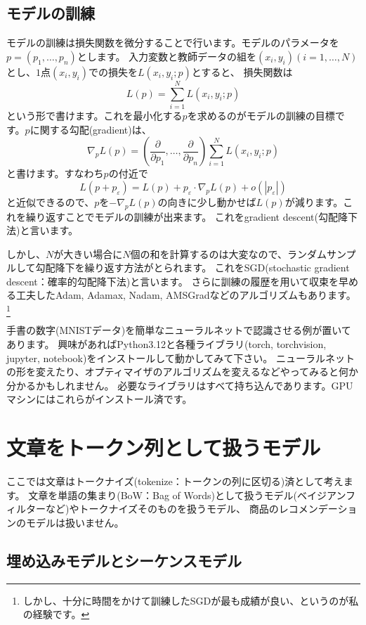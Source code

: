 \documentclass[a4j]{jarticle}
\begin{document}
\subsection{モデルの訓練}
モデルの訓練は損失関数を微分することで行います。モデルのパラメータを$p=(p_1,\ldots,p_n)$とします。
入力変数と教師データの組を$(x_i,y_i) (i=1,\ldots,N)$とし、$1$点$(x_i,y_i)$での損失を$L(x_i, y_i; p)$とすると、
損失関数は
$$L(p) = \sum_{i=1}^N L(x_i, y_i; p)$$
という形で書けます。これを最小化する$p$を求めるのがモデルの訓練の目標です。$p$に関する勾配(gradient)は、
$$\nabla_p L(p)  = \left(\frac\partial{\partial p_1},\ldots,\frac\partial{\partial p_n}\right)\sum_{i=1}^N L(x_i, y_i; p)$$
と書けます。すなわち$p$の付近で
$$L(p+p_\varepsilon) = L(p)+p_\varepsilon\cdot\nabla_p L(p) + o(|p_\varepsilon|)$$
と近似できるので、$p$を$-\nabla_p L(p)$の向きに少し動かせば$L(p)$が減ります。これを繰り返すことでモデルの訓練が出来ます。
これをgradient descent(勾配降下法)と言います。

しかし、$N$が大きい場合に$N$個の和を計算するのは大変なので、ランダムサンプルして勾配降下を繰り返す方法がとられます。
これをSGD(stochastic gradient descent：確率的勾配降下法)と言います。
さらに訓練の履歴を用いて収束を早める工夫したAdam, Adamax, Nadam, AMSGradなどのアルゴリズムもあります。
\footnote{しかし、十分に時間をかけて訓練したSGDが最も成績が良い、というのが私の経験です。}


手書の数字(MNISTデータ)を簡単なニューラルネットで認識させる例が置いてあります。
興味があればPython3.12と各種ライブラリ(torch, torchvision, jupyter, notebook)をインストールして動かしてみて下さい。
ニューラルネットの形を変えたり、オプティマイザのアルゴリズムを変えるなどやってみると何か分かるかもしれません。
必要なライブラリはすべて持ち込んであります。GPUマシンにはこれらがインストール済です。


\section{文章をトークン列として扱うモデル}
ここでは文章はトークナイズ(tokenize：トークンの列に区切る)済として考えます。
文章を単語の集まり(BoW：Bag of Words)として扱うモデル(ベイジアンフィルターなど)やトークナイズそのものを扱うモデル、
商品のレコメンデーションのモデルは扱いません。

\subsection{埋め込みモデルとシーケンスモデル}
\end{document}
